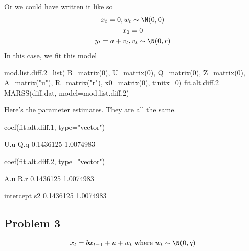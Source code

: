 \begin{wideitemize}
\begin{Schunk}
\begin{Sinput}
\end{Sinput}
\end{Schunk}
Or we could have written it like so
\begin{equation}
\begin{gathered}
x_t = 0, w_t \sim \N(0,0) \\
x_0 = 0 \\
y_t = a + v_t, v_t \sim \N(0,r)
\end{gathered}
\end{equation}
In this case, we fit this model
\begin{Schunk}
\begin{Sinput}
 mod.list.diff.2=list(
   B=matrix(0), U=matrix(0), Q=matrix(0),
   Z=matrix(0), A=matrix("u"), R=matrix("r"),
   x0=matrix(0), tinitx=0)
 fit.alt.diff.2 = MARSS(diff.dat, model=mod.list.diff.2)
 
\end{Sinput}
\end{Schunk}
Here's the parameter estimates. They are all the same.
\begin{Schunk}
\begin{Sinput}
 coef(fit.alt.diff.1, type="vector")
\end{Sinput}
\begin{Soutput}
      U.u       Q.q 
0.1436125 1.0074983 
\end{Soutput}
\begin{Sinput}
 coef(fit.alt.diff.2, type="vector")
\end{Sinput}
\begin{Soutput}
      A.u       R.r 
0.1436125 1.0074983 
\end{Soutput}
\begin{Soutput}
intercept        s2 
0.1436125 1.0074983 
\end{Soutput}
\end{Schunk}
\end{wideitemize}

\subsection*{Problem 3}

\begin{equation}
x_t = b x_{t-1}+u+w_t \text{ where } w_t \sim \N(0,q)  
\label{eq:gompertz}\end{equation}

